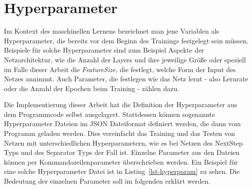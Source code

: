   

\section{Hyperparameter}


Im Kontext des maschinellen Lernens bezeichnet man jene Variablen als Hyperparameter, 
die bereits vor dem Beginn des Trainings festgelegt sein müssen.
Beispiele für solche Hyperparameter sind zum Beispiel Aspekte der Netzarchitektur, wie die Anzahl der Layers und ihre jeweilige Größe 
oder speziell im Falle dieser Arbeit die \textit{FeatureSize}, die festlegt, welche Form der Input des Netzes annimmt.
Auch Parameter, die festlegen wie das Netz lernt - also Lernrate oder die Anzahl der Epochen beim Training - zählen dazu.

Die Implementierung dieser Arbeit hat die Definition der Hyperparameter aus dem Programmcode selbst ausgelagert.
Stattdessen können sogenannte Hyperparameter Dateien im JSON Dateiformat definiert werden, die dann vom Programm geladen werden.
Dies vereinfacht das Training und das Testen von Netzen mit unterschiedlichen Hyperparametern, 
wie es bei Netzen des NextStep Typs und des Separator Typs der Fall ist.
Einzelne Parameter aus den Dateien können per Kommandozeilenparameter überschrieben werden.
Ein Beispiel für eine solche Hyperparameter Datei ist in Listing~\ref{lst-hyperparam} zu sehen.
Die Bedeutung der einzelnen Parameter soll im folgenden erklärt werden.

\newpage

